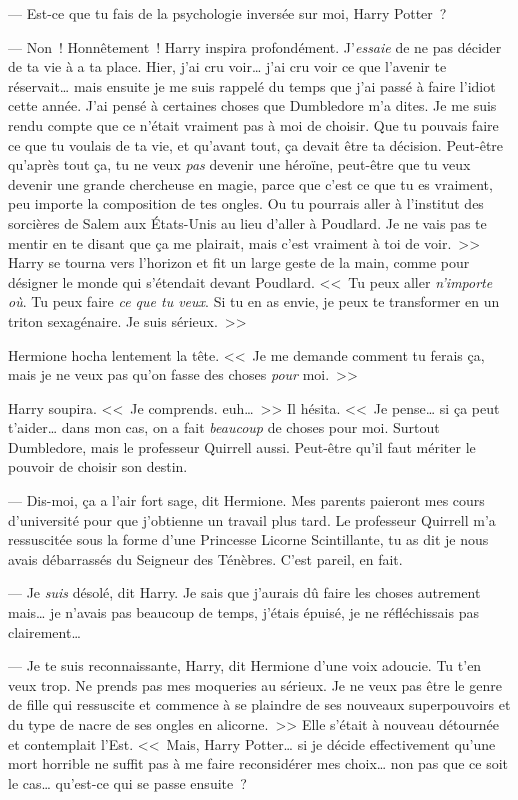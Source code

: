 --- Est-ce que tu fais de la psychologie inversée sur moi, Harry Potter~?

--- Non~! Honnêtement~! Harry inspira profondément. J'\emph{essaie} de ne pas décider de ta vie à a ta place. Hier, j'ai cru voir… j'ai cru voir ce que l'avenir te réservait… mais ensuite je me suis rappelé du temps que j'ai passé à faire l'idiot cette année. J'ai pensé à certaines choses que Dumbledore m'a dites. Je me suis rendu compte que ce n'était vraiment pas à moi de choisir. Que tu pouvais faire ce que tu voulais de ta vie, et qu'avant tout, ça devait être ta décision. Peut-être qu'après tout ça, tu ne veux \emph{pas} devenir une héroïne, peut-être que tu veux devenir une grande chercheuse en magie, parce que c'est ce que tu es vraiment, peu importe la composition de tes ongles. Ou tu pourrais aller à l'institut des sorcières de Salem aux États-Unis au lieu d'aller à Poudlard. Je ne vais pas te mentir en te disant que ça me plairait, mais c'est vraiment à toi de voir.~>> Harry se tourna vers l'horizon et fit un large geste de la main, comme pour désigner le monde qui s'étendait devant Poudlard. <<~Tu peux aller \emph{n'importe où}. Tu peux faire \emph{ce que tu veux}. Si tu en as envie, je peux te transformer en un triton sexagénaire. Je suis sérieux.~>>

Hermione hocha lentement la tête. <<~Je me demande comment tu ferais ça, mais je ne veux pas qu'on fasse des choses \emph{pour} moi.~>>

Harry soupira. <<~Je comprends. euh…~>> Il hésita. <<~Je pense… si ça peut t'aider… dans mon cas, on a fait \emph{beaucoup} de choses pour moi. Surtout Dumbledore, mais le professeur Quirrell aussi. Peut-être qu'il faut mériter le pouvoir de choisir son destin.

--- Dis-moi, ça a l'air fort sage, dit Hermione. Mes parents paieront mes cours d'université pour que j'obtienne un travail plus tard. Le professeur Quirrell m'a ressuscitée sous la forme d'une Princesse Licorne Scintillante, tu as dit je nous avais débarrassés du Seigneur des Ténèbres. C'est pareil, en fait.

--- Je \emph{suis} désolé, dit Harry. Je sais que j'aurais dû faire les choses autrement mais… je n'avais pas beaucoup de temps, j'étais épuisé, je ne réfléchissais pas clairement…

--- Je te suis reconnaissante, Harry, dit Hermione d'une voix adoucie. Tu t'en veux trop. Ne prends pas mes moqueries au sérieux. Je ne veux pas être le genre de fille qui ressuscite et commence à se plaindre de ses nouveaux superpouvoirs et du type de nacre de ses ongles en alicorne.~>> Elle s'était à nouveau détournée et contemplait l'Est. <<~Mais, Harry Potter… si je décide effectivement qu'une mort horrible ne suffit pas à me faire reconsidérer mes choix… non pas que ce soit le cas… qu'est-ce qui se passe ensuite~?

